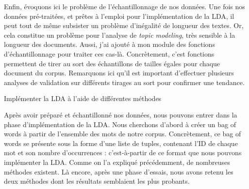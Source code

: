 \documentclass[letterpaper,portrait,12pt]{article}
\begin{document}
	


	Enfin, \'{e}voquons ici le probl\`{e}me de l'\'{e}chantillonnage de nos donn\'{e}es. Une fois nos donn\'{e}es pr\'{e}-trait\'{e}es, et pr\^{e}tes \`{a} l'emploi pour l'impl\'{e}mentation de la LDA, il peut tout de m\^{e}me subsister un probl\`{e}me d'in\'{e}galit\'{e} de longueur des textes. Or, cela constitue un probl\`{e}me pour l'analyse de \emph{topic modeling}, tr\`{e}s sensible \`{a} la longueur des documents. Aussi, j'ai ajout\'{e} \`{a} mon module des fonctions d'\'{e}chantillonnage pour traiter ces cas-l\`{a}. Concr\`{e}tement, c'est fonctions permettent de tirer au sort des \'{e}chantillons de tailles \'{e}gales pour chaque document du corpus. Remarquons ici qu'il est important d'effectuer plusieurs analyses de validation sur diff\'{e}rents tirages au sort pour confirmer une tendance.  





	Impl\'{e}menter la LDA \`{a} l'aide de diff\'{e}rentes m\'{e}thodes





Apr\`{e}s avoir pr\'{e}par\'{e} et \'{e}chantillonn\'{e} nos donn\'{e}es, nous pouvons entrer dans la phase d'impl\'{e}mentation de la LDA. Nous cherchons d'abord \`{a} cr\'{e}er un bag of words \`{a} partir de l'ensemble des mots de notre corpus. Concr\`{e}tement, ce bag of words se pr\'{e}sente sous la forme d'une liste de tuples, contenant l'ID de chaque mot et son nombre d'occurrences : c'est-\`{a}-partir de ce format que nous pouvons impl\'{e}menter la LDA. Comme on l'a expliqu\'{e} pr\'{e}c\'{e}demment, de nombreuses m\'{e}thodes existent. L\`{a} encore, apr\`{e}s une phase d'essais, nous avons retenu les deux m\'{e}thodes dont les r\'{e}sultats semblaient les plus probants. 
\end{document}
